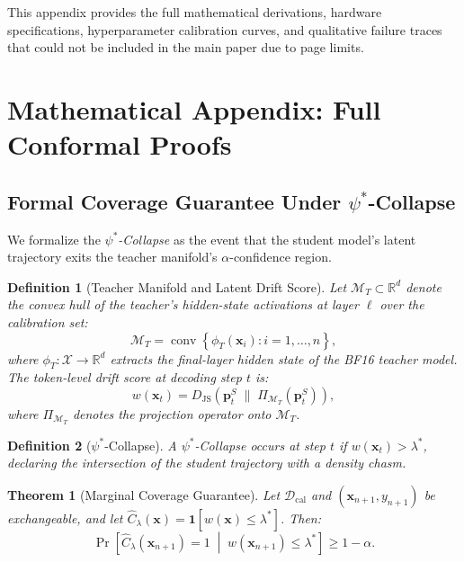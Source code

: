 \documentclass[runningheads]{article} %
\newtheorem{theorem}{Theorem}
\newtheorem{definition}{Definition}
\begin{document}
\appendix

\noindent This appendix provides the full mathematical derivations,
hardware specifications, hyperparameter calibration curves,
and qualitative failure traces that could not be included
in the main paper due to page limits.

\section{Mathematical Appendix: Full Conformal Proofs}
\label{app:proofs}

\subsection{Formal Coverage Guarantee Under \texorpdfstring{$\psi^*$}{psi*}-Collapse}

We formalize the \emph{$\psi^*$-Collapse} as the event that the student
model's latent trajectory exits the teacher manifold's $\alpha$-confidence region.

\begin{definition}[Teacher Manifold and Latent Drift Score]
Let $\mathcal{M}_T \subset \mathbb{R}^d$ denote the convex hull
of the teacher's hidden-state activations at layer $\ell$ over the
calibration set:
\begin{equation}
  \mathcal{M}_T = \operatorname{conv}\!\left\{
    \phi_T(\mathbf{x}_i) : i = 1,\ldots,n \right\},
\end{equation}
where $\phi_T : \mathcal{X} \to \mathbb{R}^{d}$ extracts the
final-layer hidden state of the BF16 teacher model.
The token-level drift score at decoding step $t$ is:
\begin{equation}
  w(\mathbf{x}_t) =
    D_\text{JS}\!\left(\mathbf{p}_t^S \;\|\;
    \Pi_{\mathcal{M}_T}(\mathbf{p}_t^S)\right),
\end{equation}
where $\Pi_{\mathcal{M}_T}$ denotes the projection operator onto
$\mathcal{M}_T$.
\end{definition}

\begin{definition}[$\psi^*$-Collapse]
A $\psi^*$\emph{-Collapse} occurs at step $t$ if
$w(\mathbf{x}_t) > \lambda^*$, declaring the intersection
of the student trajectory with a density chasm.
\end{definition}

\begin{theorem}[Marginal Coverage Guarantee]
\label{thm:coverage}
Let $\mathcal{D}_\text{cal}$ and $(\mathbf{x}_{n+1}, y_{n+1})$ be
exchangeable, and let $\hat{C}_\lambda(\mathbf{x}) =
\mathbf{1}[w(\mathbf{x}) \leq \lambda^*]$.
Then:
\begin{equation}
  \Pr\!\left[\hat{C}_\lambda(\mathbf{x}_{n+1}) = 1 \;\middle|\;
    w(\mathbf{x}_{n+1}) \leq \lambda^*\right] \geq 1 - \alpha.
\end{equation}
\end{theorem}
\end{document}
